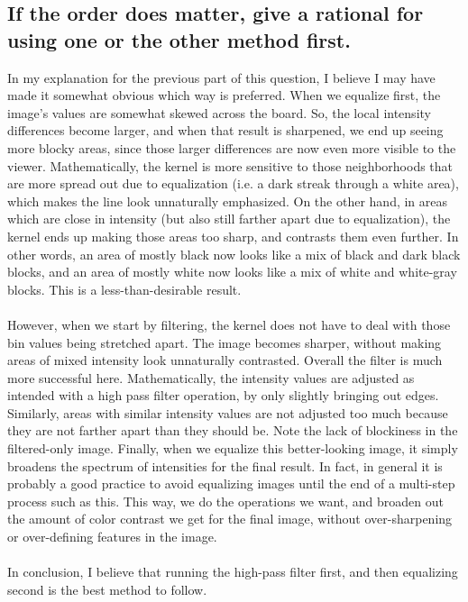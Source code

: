 \documentclass[11pt]{article}
\begin{document}
\subsection{If the order does matter, give a rational for using one or the other method first.}
In my explanation for the previous part of this question, I believe I may have made it somewhat obvious which way is preferred. When we equalize first, the image's values are somewhat skewed across the board. So, the local intensity differences become larger, and when that result is sharpened, we end up seeing more blocky areas, since those larger differences are now even more visible to the viewer. Mathematically, the kernel is more sensitive to those neighborhoods that are more spread out due to equalization (i.e. a dark streak through a white area), which makes the line look unnaturally emphasized. On the other hand, in areas which are close in intensity (but also still farther apart due to equalization), the kernel ends up making those areas too sharp, and contrasts them even further. In other words, an area of mostly black now looks like a mix of black and dark black blocks, and an area of mostly white now looks like a mix of white and white-gray blocks. This is a less-than-desirable result.\\
\\
However, when we start by filtering, the kernel does not have to deal with those bin values being stretched apart. The image becomes sharper, without making areas of mixed intensity look unnaturally contrasted. Overall the filter is much more successful here. Mathematically, the intensity values are adjusted as intended with a high pass filter operation, by only slightly bringing out edges. Similarly, areas with similar intensity values are not adjusted too much because they are not farther apart than they should be. Note the lack of blockiness in the filtered-only image. Finally, when we equalize this better-looking image, it simply broadens the spectrum of intensities for the final result. In fact, in general it is probably a good practice to avoid equalizing images until the end of a multi-step process such as this. This way, we do the operations we want, and broaden out the amount of color contrast we get for the final image, without over-sharpening or over-defining features in the image.\\
\\
In conclusion, I believe that running the high-pass filter first, and then equalizing second is the best method to follow.
\end{document}
